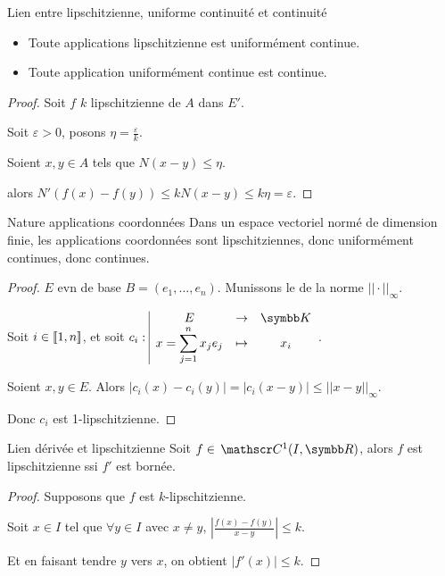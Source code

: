 \begin{proposition}{Lien entre lipschitzienne, uniforme continuité et continuité}{}
    \begin{itemize}
        \item Toute applications lipschitzienne est uniformément continue. 

        \item Toute application uniformément continue est continue.
    \end{itemize}
\end{proposition}


\begin{proof}
    Soit $f$ $k$ lipschitzienne de $A$ dans $E'$.

    Soit $\varepsilon > 0$, posons $\eta = \frac \varepsilon k$.

    Soient $x, y \in A$ tels que $N(x - y) \leqslant \eta$.

    alors $N'(f(x) - f(y)) \leqslant k N(x - y) \leqslant k \eta = \varepsilon$.
\end{proof}

\begin{proposition}{Nature applications coordonnées}{}
    Dans un espace vectoriel normé de dimension finie, les applications coordonnées sont lipschitziennes, 
    donc uniformément continues, donc continues. 
\end{proposition}

\begin{proof}
    $E$ evn de base $B = (e_1, \ldots, e_n)$. Munissons le de la norme $||\cdot||_\infty$.

    Soit $i \in [\![1, n]\!]$, et soit $\fonction{c_i}{E}{\K}{x = \sum_{j=1}^n x_j e_j}{x_i}$.

    Soient $x, y \in E$. Alors $|c_i(x) - c_i(y)| = |c_i(x - y) | \leqslant ||x - y||_\infty$.

    Donc $c_i$ est 1-lipschitzienne. 
\end{proof}

\begin{theoreme}{Lien dérivée et lipschitzienne}{}
    Soit $f \in \mc 1(I, \R)$, alors $f$ est lipschitzienne ssi $f'$ est bornée.
\end{theoreme}

\begin{proof}
    Supposons que $f$ est $k$-lipschitzienne. 

    Soit $x \in I$ tel que $\forall y \in I$ avec $x \neq y$, $\left|\frac{f(x) - f(y) }{x - y}\right| \leqslant k$. 

    Et en faisant tendre $y$ vers $x$, on obtient $|f'(x)| \leqslant k$.
\end{proof}

